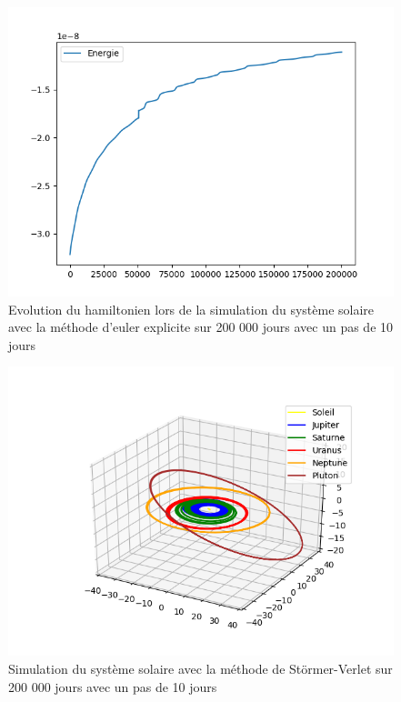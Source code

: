 \documentclass{article}
\begin{document}
\begin{figure}[!h]
\begin{center}
\includegraphics[scale=0.65]{Hamiltonien_euler.png}
\caption{Evolution du hamiltonien lors de la simulation du système solaire avec la méthode d'euler explicite sur 200 000 jours avec un pas de 10 jours}
\end{center}
\end{figure}
\newpage
\begin{figure}[!h]
\begin{center}
\includegraphics[scale=0.7]{Simulation_stormer_verlet.png}
\caption{Simulation du système solaire avec la méthode de Störmer-Verlet sur 200 000 jours avec un pas de 10 jours}
\end{center}
\end{figure}
\end{document}
